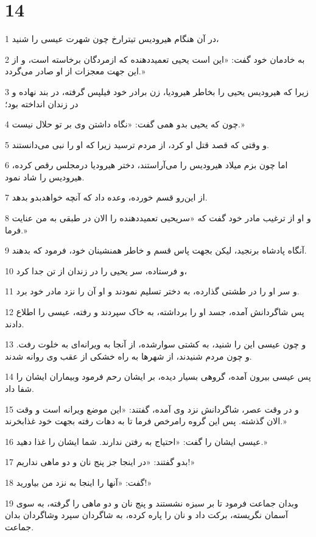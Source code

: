 \chapter{14}

\par 1 در آن هنگام هیرودیس تیترارخ چون شهرت عیسی را شنید،
\par 2 به خادمان خود گفت: «این است یحیی تعمید‌دهنده که ازمردگان برخاسته است، و از این جهت معجزات از او صادر می‌گردد.»
\par 3 زیرا که هیرودیس یحیی را بخاطر هیرودیا، زن برادر خود فیلپس گرفته، در بند نهاده و در زندان انداخته بود؛
\par 4 چون که یحیی بدو همی گفت: «نگاه داشتن وی بر تو حلال نیست.»
\par 5 و وقتی که قصد قتل او کرد، از مردم ترسید زیرا که او را نبی می‌دانستند.
\par 6 اما چون بزم میلاد هیرودیس را می‌آراستند، دختر هیرودیا درمجلس رقص کرده، هیرودیس را شاد نمود.
\par 7 از این‌رو قسم خورده، وعده داد که آنچه خواهدبدو بدهد.
\par 8 و او از ترغیب مادر خود گفت که «سریحیی تعمید‌دهنده را الان در طبقی به من عنایت فرما.»
\par 9 آنگاه پادشاه برنجید، لیکن بجهت پاس قسم و خاطر همنشینان خود، فرمود که بدهند.
\par 10 و فرستاده، سر یحیی را در زندان از تن جدا کرد،
\par 11 و سر او را در طشتی گذارده، به دختر تسلیم نمودند و او آن را نزد مادر خود برد.
\par 12 پس شاگردانش آمده، جسد او را برداشته، به خاک سپردند و رفته، عیسی را اطلاع دادند.
\par 13 و چون عیسی این را شنید، به کشتی سوارشده، از آنجا به ویرانه‌ای به خلوت رفت. و چون مردم شنیدند، از شهرها به راه خشکی از عقب وی روانه شدند.
\par 14 پس عیسی بیرون آمده، گروهی بسیار دیده، بر ایشان رحم فرمود وبیماران ایشان را شفا داد.
\par 15 و در وقت عصر، شاگردانش نزد وی آمده، گفتند: «این موضع ویرانه است و وقت الان گذشته. پس این گروه رامرخص فرما تا به دهات رفته بجهت خود غذابخرند.»
\par 16 عیسی ایشان را گفت: «احتیاج به رفتن ندارند. شما ایشان را غذا دهید.»
\par 17 بدو گفتند: «در اینجا جز پنج نان و دو ماهی نداریم!»
\par 18 گفت: «آنها را اینجا به نزد من بیاورید!»
\par 19 وبدان جماعت فرمود تا بر سبزه نشستند و پنج نان و دو ماهی را گرفته، به سوی آسمان نگریسته، برکت داد و نان را پاره کرده، به شاگردان سپرد وشاگردان بدان جماعت.
